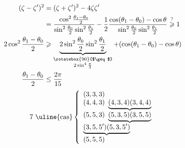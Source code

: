 \[
\begin{aligned}
(\zeta-\zeta')^2&=(\zeta+\zeta')^2-4\zeta\zeta'\\
&=\frac{\cos^2\frac{\theta_1-\theta_0}{2}}{\sin^2\frac{\theta_0}2\sin^2\frac{\theta_1}2}
-\frac12\frac{\cos(\theta_1-\theta_0)-\cos\theta}{\sin^2\frac{\theta_0}2\sin^2\frac{\theta_1}2}
\overset{?}{\geqslant}1\\
2\cos^2\frac{\theta_1-\theta_0}{2}&\geqslant
\underbrace{2\sin^2\frac{\theta_0}2\sin^2\frac{\theta_1}2}_{\substack{\rotatebox{90}{$\geq$}\\2\sin^4\frac{\pi}{3}}}
+(\cos(\theta_1-\theta_0)-\cos\theta)\\
\frac{\theta_1-\theta_0}{2}&\leq\frac{2\pi}{15}
\end{aligned}
\]
\[
7\ \text{\uline{cas}}\left\{\begin{array}{l}
(3,3,3)\\
(4,4,3)\ \underbrace{(4,3,4)(3,4,4)}\\
(5,5,3)\ \underbrace{(5,3,5)(3,5,5)}\\
\underbrace{(3,5,5')(5,3,5')}\\
(5,5,5)
\end{array}\right.
\]
